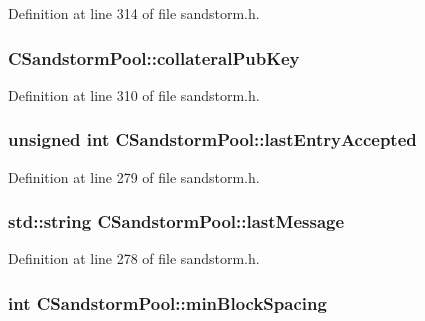 Definition at line 314 of file sandstorm.\+h.

\hypertarget{class_c_sandstorm_pool_afc6af6d3ef8fbe2c6238d3564145a015}{}
\subsubsection[{collateral\+Pub\+Key}]{ C\+Sandstorm\+Pool\+::collateral\+Pub\+Key}\label{class_c_sandstorm_pool_afc6af6d3ef8fbe2c6238d3564145a015}


Definition at line 310 of file sandstorm.\+h.

\hypertarget{class_c_sandstorm_pool_affec253e6cc6927c89002d1c7ccc4cf0}{}
\subsubsection[{last\+Entry\+Accepted}]{\setlength{\rightskip}{0pt plus 5cm}unsigned int C\+Sandstorm\+Pool\+::last\+Entry\+Accepted}\label{class_c_sandstorm_pool_affec253e6cc6927c89002d1c7ccc4cf0}


Definition at line 279 of file sandstorm.\+h.

\hypertarget{class_c_sandstorm_pool_ade4dc2454943976a421411d287b395c6}{}
\subsubsection[{last\+Message}]{\setlength{\rightskip}{0pt plus 5cm}std\+::string C\+Sandstorm\+Pool\+::last\+Message}\label{class_c_sandstorm_pool_ade4dc2454943976a421411d287b395c6}


Definition at line 278 of file sandstorm.\+h.

\hypertarget{class_c_sandstorm_pool_a955b0b4d31bd4160866d3205c6c3f023}{}
\subsubsection[{min\+Block\+Spacing}]{\setlength{\rightskip}{0pt plus 5cm}int C\+Sandstorm\+Pool\+::min\+Block\+Spacing}\label{class_c_sandstorm_pool_a955b0b4d31bd4160866d3205c6c3f023}


